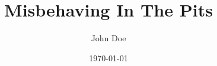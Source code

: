 \nobibliography*                            %

\newcommand{\tit}{\textbf{Misbehaving In The Pits}}

\newcommand{\abs}{
\blindtext
}

\title{\tit}

\author{John Doe}

\date{\today}

\maketitle

\thispagestyle{empty}

\begin{abstract}
    \noindent
    \abs
\end{abstract}

\cleardoublepage

\onehalfspacing

\begin{toc}
\thispagestyle{empty}
\begin{singlespacing}
\tableofcontents
\end{singlespacing}
\clearpage
\end{toc}

\setcounter{page}{1}

